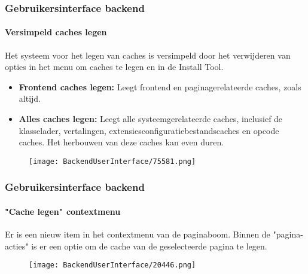 \begin{frame}[fragile]
	\frametitle{Gebruikersinterface backend}
	\framesubtitle{Versimpeld caches legen}

	Het systeem voor het legen van caches is versimpeld door het verwijderen van opties in het
	menu om caches te legen en in de Install Tool.

	\begin{itemize}

		\item \textbf{Frontend caches legen:}\newline
			\small
				Leegt frontend en paginagerelateerde caches, zoals altijd.
			\normalsize

		\item \textbf{Alles caches legen:}\newline
			\small
				Leegt alle systeemgerelateerde caches, inclusief de klasselader, vertalingen,
				extensiesconfiguratiebestandscaches en opcode caches. Het herbouwen van deze caches
				kan even duren.
			\normalsize

	\end{itemize}

	\begin{figure}
		\texttt{[image: BackendUserInterface/75581.png]}
	\end{figure}

\end{frame}

\begin{frame}[fragile]
	\frametitle{Gebruikersinterface backend}
	\framesubtitle{"Cache legen" contextmenu}

	Er is een nieuw item in het contextmenu van de paginaboom. Binnen de "pagina-acties" is er een optie
	om de cache van de geselecteerde pagina te legen.

	\begin{figure}
		\texttt{[image: BackendUserInterface/20446.png]}
	\end{figure}

\end{frame}

